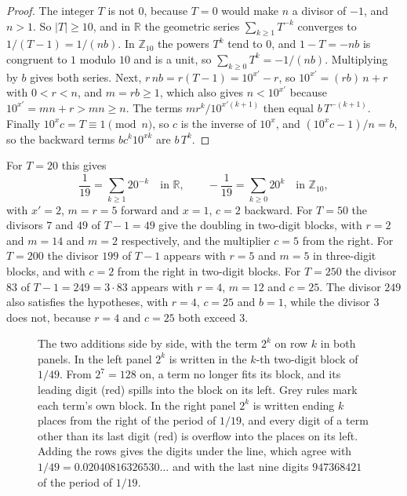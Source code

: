\documentclass[11pt,a4paper]{amsart}
\theoremstyle{definition}
\theoremstyle{remark}
\newcommand{\Ztena}{\mathbb{Z}_{10}}
\begin{document}
\begin{proof}
The integer $T$ is not $0$, because $T = 0$ would make $n$ a divisor of $-1$, and $n > 1$. So $|T| \ge 10$, and in $\mathbb{R}$ the geometric series $\sum_{k\ge1} T^{-k}$ converges to $1/(T-1) = 1/(nb)$. In
$\Ztena$ the powers $T^k$ tend to $0$, and $1 - T = -nb$ is congruent to $1$
modulo $10$ and is a unit, so $\sum_{k\ge0} T^k = -1/(nb)$. Multiplying by $b$
gives both series. Next, $r\,nb = r(T - 1) = 10^{x'} - r$, so $10^{x'} = (rb)\,n + r$ with $0 < r < n$, and $m = rb \ge 1$, which also gives $n < 10^{x'}$ because $10^{x'} = mn + r > mn \ge n$. The terms
$m r^k/10^{x'(k+1)}$ then equal $b\,T^{-(k+1)}$. Finally $10^x c = T \equiv 1
\pmod n$, so $c$ is the inverse of $10^x$, and $(10^x c - 1)/n = b$, so the
backward terms $b c^k 10^{xk}$ are $b\,T^k$.
\end{proof}

For $T = 20$ this gives
\begin{equation}\label{eq:T20}
\frac1{19} = \sum_{k\ge1} 20^{-k} \quad\text{in } \mathbb{R},\qquad
-\frac1{19} = \sum_{k\ge0} 20^{k} \quad\text{in } \Ztena ,
\end{equation}
with $x' = 2$, $m = r = 5$ forward and $x = 1$, $c = 2$ backward. For $T = 50$ the divisors $7$ and $49$ of $T - 1 = 49$ give the doubling in two-digit blocks, with $r = 2$ and $m = 14$ and $m = 2$ respectively, and the multiplier $c = 5$ from the right. For $T = 200$ the divisor $199$ of $T - 1$ appears with $r = 5$ and $m = 5$ in three-digit blocks, and with $c = 2$ from the right in two-digit blocks. For $T = 250$ the divisor $83$ of $T - 1 = 249 = 3\cdot 83$ appears with $r = 4$, $m = 12$ and $c = 25$. The divisor $249$ also satisfies the hypotheses, with $r = 4$, $c = 25$ and $b = 1$, while the divisor $3$ does not, because $r = 4$ and $c = 25$ both exceed $3$.

\begin{figure}[htb]
\centering

\caption{The two additions side by side, with the term $2^k$ on row $k$ in
both panels. In the left panel $2^k$ is written in the $k$-th two-digit block
of $1/49$. From $2^7 = 128$ on, a term no longer fits its block, and its
leading digit (red) spills into the block on its left. Grey rules mark each
term's own block. In the right panel $2^k$ is written ending $k$ places from
the right of the period of $1/19$, and every digit of a term other than its
last digit (red) is overflow into the places on its left. Adding the rows
gives the digits under the line, which agree with
$1/49 = 0.02040816326530\dots$ and with the last nine digits $947368421$ of
the period of $1/19$.}
\label{fig:additions}
\end{figure}
\end{document}
